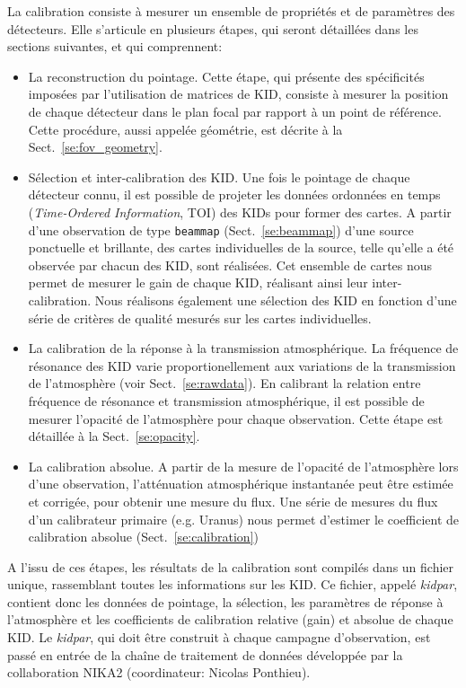 La calibration consiste à mesurer un ensemble de propriétés et de
paramètres des détecteurs. Elle s'articule en plusieurs étapes, qui
seront détaillées dans les sections suivantes, et qui comprennent:
\begin{itemize}
  \item{La reconstruction du pointage. Cette étape, qui présente
    des spécificités imposées par l'utilisation de matrices de KID,
    consiste à mesurer la position de chaque détecteur dans le plan
    focal par rapport à un point de référence. Cette procédure, aussi
    appelée géométrie, est décrite à la Sect.~\ref{se:fov_geometry}.}
  \item{Sélection et inter-calibration des KID. Une fois le pointage
    de chaque détecteur connu, il est possible de projeter les données
    ordonnées en temps (\emph{Time-Ordered Information}, TOI)} des KIDs
    pour former des cartes. A partir d'une observation de type
    {\tt beammap} (Sect.~\ref{se:beammap}) d'une source ponctuelle
    et brillante, des cartes individuelles de la source, telle qu'elle
    a été observée par chacun des KID, sont réalisées. Cet ensemble
    de cartes nous permet de mesurer le gain de chaque KID, réalisant
    ainsi leur inter-calibration. Nous réalisons également une
    sélection des KID en fonction d'une série de critères de qualité
    mesurés sur les cartes individuelles.
  \item{La calibration de la réponse à la transmission
    atmosphérique. La fréquence de résonance des KID varie
    proportionellement aux variations de la transmission de
    l'atmosphère (voir Sect.~\ref{se:rawdata}). En calibrant la
    relation entre
    fréquence de résonance et transmission atmosphérique, il est
    possible de mesurer l'opacité de l'atmosphère pour chaque
    observation. Cette étape est détaillée à la
    Sect.~\ref{se:opacity}.}
  \item{La calibration absolue. A partir de la mesure de l'opacité de
    l'atmosphère lors d'une observation, l'atténuation atmosphérique
    instantanée peut être estimée et corrigée, pour obtenir une mesure
    du flux. Une série de mesures du flux d'un calibrateur primaire
    (e.g. Uranus) nous permet d'estimer le coefficient de calibration
    absolue (Sect.~\ref{se:calibration})}
\end{itemize}

A l'issu de ces étapes, les résultats de la calibration sont compilés
dans un fichier unique, rassemblant toutes les informations sur les
KID. Ce fichier, appelé \emph{kidpar}, contient donc les données de
pointage, la sélection, les paramètres de réponse à l'atmosphère et
les coefficients de calibration relative (gain) et absolue de chaque
KID. Le \emph{kidpar}, qui doit être construit à chaque campagne
d'observation, est passé en entrée de la chaîne de traitement de
données développée par la collaboration NIKA2 (coordinateur: Nicolas
Ponthieu).

